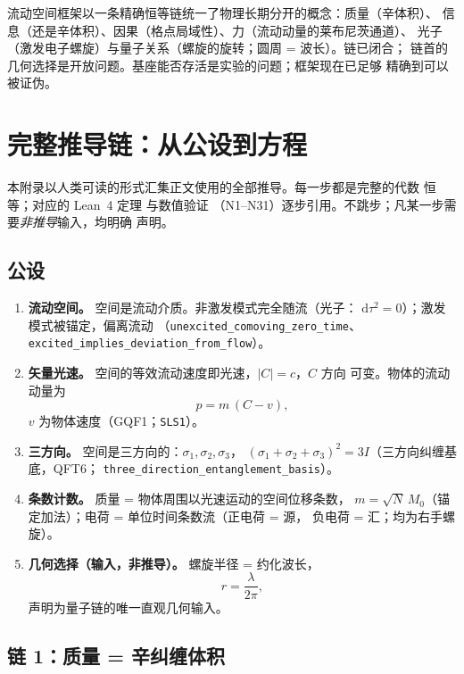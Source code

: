 \documentclass[aps,prd,preprint,superscriptaddress,amsmath,amssymb]{revtex4-2}
\begin{document}
流动空间框架以一条精确恒等链统一了物理长期分开的概念：质量（辛体积）、
信息（还是辛体积）、因果（格点局域性）、力（流动动量的莱布尼茨通道）、
光子（激发电子螺旋）与量子关系（螺旋的旋转；圆周 = 波长）。链已闭合；
链首的几何选择是开放问题。基座能否存活是实验的问题；框架现在已足够
精确到可以被证伪。

\appendix
\section{完整推导链：从公设到方程}
\label{app:derivations}

本附录以人类可读的形式汇集正文使用的全部推导。每一步都是完整的代数
恒等；对应的 Lean~4 定理 \cite{de2015lean} 与数值验证
（N1--N31）逐步引用。不跳步；凡某一步需要\emph{非推导}输入，均明确
声明。

\subsection{公设}
\label{app:postulates}

\begin{enumerate}
\item \textbf{流动空间。} 空间是流动介质。非激发模式完全随流（光子：
$\mathrm d\tau^2=0$）；激发模式被锚定，偏离流动
（\texttt{unexcited\_comoving\_zero\_time}、
\texttt{excited\_implies\_deviation\_from\_flow}）。
\item \textbf{矢量光速。} 空间的等效流动速度即光速，$|C|=c$，$C$ 方向
可变。物体的流动动量为
\begin{equation}
p = m\,(C-v),
\label{eq:flowmomentum}
\end{equation}
$v$ 为物体速度（GQF1；\texttt{SLS1}）。
\item \textbf{三方向。} 空间是三方向的：$\sigma_1,\sigma_2,\sigma_3$，
$(\sigma_1+\sigma_2+\sigma_3)^2=3I$（三方向纠缠基底，QFT6；
\texttt{three\_direction\_\allowbreak entanglement\_basis}）。
\item \textbf{条数计数。} 质量 = 物体周围以光速运动的空间位移条数，
$m=\sqrt N\,M_0$（锚定加法）；电荷 = 单位时间条数流（正电荷 = 源，
负电荷 = 汇；均为右手螺旋）。
\item \textbf{几何选择（输入，非推导）。} 螺旋半径 = 约化波长，
\begin{equation}
r = \frac{\lambda}{2\pi},
\label{eq:rchoice}
\end{equation}
声明为量子链的唯一直观几何输入。
\end{enumerate}

\subsection{链 1：质量 = 辛纠缠体积}
\label{app:chain1}
\end{document}
